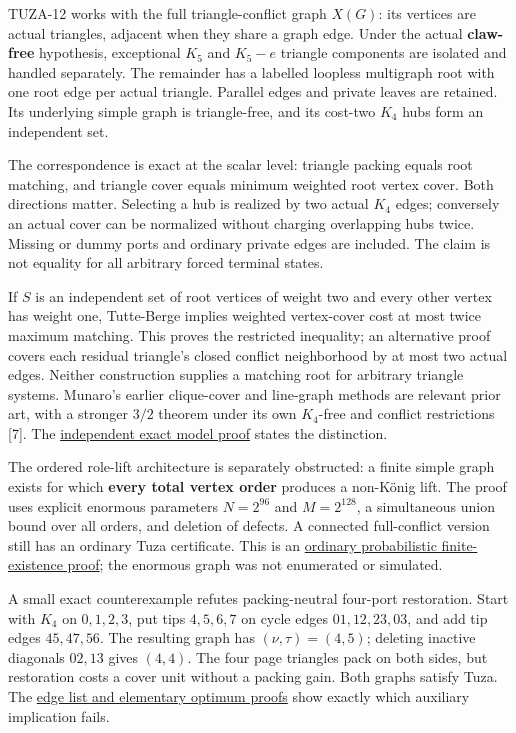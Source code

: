 \documentclass[11pt,a4paper]{article}
\begin{document}
TUZA-12 works with the full triangle-conflict graph \(X(G)\): its vertices are actual triangles, adjacent when they share a graph edge. Under the actual \textbf{claw-free} hypothesis, exceptional \(K_5\) and \(K_5-e\) triangle components are isolated and handled separately. The remainder has a labelled loopless multigraph root with one root edge per actual triangle. Parallel edges and private leaves are retained. Its underlying simple graph is triangle-free, and its cost-two \(K_4\) hubs form an independent set.

The correspondence is exact at the scalar level: triangle packing equals root matching, and triangle cover equals minimum weighted root vertex cover. Both directions matter. Selecting a hub is realized by two actual \(K_4\) edges; conversely an actual cover can be normalized without charging overlapping hubs twice. Missing or dummy ports and ordinary private edges are included. The claim is not equality for all arbitrary forced terminal states.

If \(S\) is an independent set of root vertices of weight two and every other vertex has weight one, Tutte-Berge implies weighted vertex-cover cost at most twice maximum matching. This proves the restricted inequality; an alternative proof covers each residual triangle's closed conflict neighborhood by at most two actual edges. Neither construction supplies a matching root for arbitrary triangle systems. Munaro's earlier clique-cover and line-graph methods are relevant prior art, with a stronger \(3/2\) theorem under its own \(K_4\)-free and conflict restrictions {[}7{]}. The \href{https://github.com/pappa211/ai-math-experiments/blob/main/problems/TUZA-12/INDEPENDENT_PROOF_B.md}{independent exact model proof} states the distinction.

The ordered role-lift architecture is separately obstructed: a finite simple graph exists for which \textbf{every total vertex order} produces a non-König lift. The proof uses explicit enormous parameters \(N=2^{96}\) and \(M=2^{128}\), a simultaneous union bound over all orders, and deletion of defects. A connected full-conflict version still has an ordinary Tuza certificate. This is an \href{https://github.com/pappa211/ai-math-experiments/blob/main/problems/TUZA-12/INDEPENDENT_PROOF_A.md}{ordinary probabilistic finite-existence proof}; the enormous graph was not enumerated or simulated.

A small exact counterexample refutes packing-neutral four-port restoration. Start with \(K_4\) on \(0,1,2,3\), put tips \(4,5,6,7\) on cycle edges \(01,12,23,03\), and add tip edges \(45,47,56\). The resulting graph has \((\nu,\tau)=(4,5)\); deleting inactive diagonals \(02,13\) gives \((4,4)\). The four page triangles pack on both sides, but restoration costs a cover unit without a packing gain. Both graphs satisfy Tuza. The \href{https://github.com/pappa211/ai-math-experiments/blob/main/problems/TUZA-12/notes/FOUR_PORT_RESTORATION_COUNTEREXAMPLE.md}{edge list and elementary optimum proofs} show exactly which auxiliary implication fails.
\end{document}
